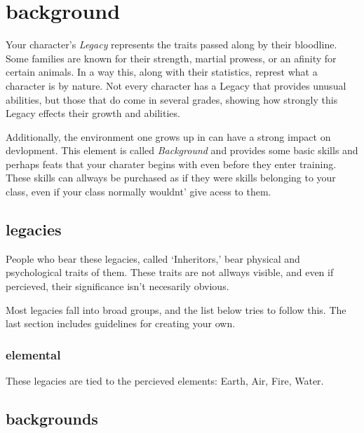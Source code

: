 \chapter{background}
Your character's \emph{Legacy} represents the traits passed
along by their bloodline. Some families are known for their
strength, martial prowess, or an afinity for certain animals.
In a way this, along with their statistics, represt what a
character is by nature. Not every character has a Legacy that
provides unusual abilities, but those that do come in several
grades, showing how strongly this Legacy effects their growth
and abilities.

Additionally, the environment one grows up in can have a strong impact on
devlopment. This element is called \emph{Background} and
provides some basic skills and perhaps feats that your charater
begins with even before they enter training. These skills can
allways be purchased as if they were skills belonging to your
class, even if your class normally wouldnt' give acess to them.

\section{legacies}
People who bear these legacies, called `Inheritors,' bear
physical and psychological traits of them. These traits are not
allways visible, and even if percieved, their significance isn't
necesarily obvious.

Most legacies fall into broad groups, and the list below tries
to follow this. The last section includes guidelines for
creating your own.
\subsection{elemental}
These legacies are tied to the percieved elements: Earth, Air, Fire, Water.
\section{backgrounds}
